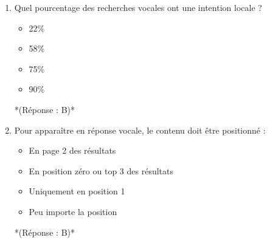 \documentclass[12pt,a4paper,twoside]{report}
\begin{document}
\begin{enumerate}
    \item Quel pourcentage des recherches vocales ont une intention locale ?
    \begin{itemize}
        \item[A)] 22\%
        \item[B)] 58\%
        \item[C)] 75\%
        \item[D)] 90\%
    \end{itemize}
    *(Réponse : B)*

    \item Pour apparaître en réponse vocale, le contenu doit être positionné :
    \begin{itemize}
        \item[A)] En page 2 des résultats
        \item[B)] En position zéro ou top 3 des résultats
        \item[C)] Uniquement en position 1
        \item[D)] Peu importe la position
    \end{itemize}
    *(Réponse : B)*
\end{enumerate}
\end{document}

